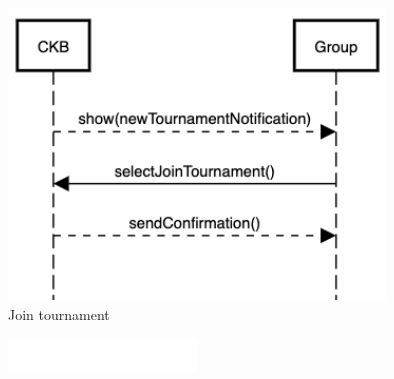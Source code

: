 \documentclass{article}
\begin{document}
            \begin{figure}[!ht]
                \centering
                \includegraphics[width=10cm]{LaudiziMarusicMassarelli/RASD/JoinTournament.png}
                \caption{Join tournament}
                \label{fig:join Tournament}
            \end{figure}
            
            \begin{figure}[!ht]
                \centering
                \includegraphics[width=5cm]{LaudiziMarusicMassarelli/RASD/white.jpg}
                \label{fig:white}
            \end{figure}
             
\end{document}
